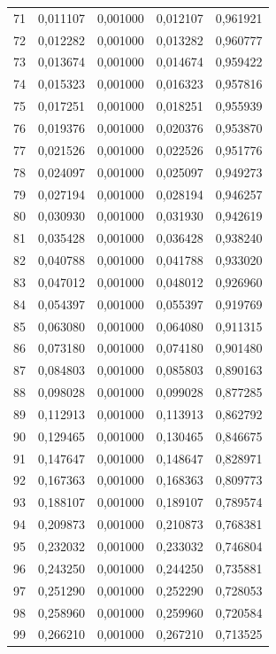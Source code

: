 \begin{small}
\begin{longtable}{rrrrr}
71 & 0,011107 & 0,001000 & 0,012107 & 0,961921 \\
72 & 0,012282 & 0,001000 & 0,013282 & 0,960777 \\
73 & 0,013674 & 0,001000 & 0,014674 & 0,959422 \\
74 & 0,015323 & 0,001000 & 0,016323 & 0,957816 \\
75 & 0,017251 & 0,001000 & 0,018251 & 0,955939 \\
76 & 0,019376 & 0,001000 & 0,020376 & 0,953870 \\
77 & 0,021526 & 0,001000 & 0,022526 & 0,951776 \\
78 & 0,024097 & 0,001000 & 0,025097 & 0,949273 \\
79 & 0,027194 & 0,001000 & 0,028194 & 0,946257 \\
80 & 0,030930 & 0,001000 & 0,031930 & 0,942619 \\
81 & 0,035428 & 0,001000 & 0,036428 & 0,938240 \\
82 & 0,040788 & 0,001000 & 0,041788 & 0,933020 \\
83 & 0,047012 & 0,001000 & 0,048012 & 0,926960 \\
84 & 0,054397 & 0,001000 & 0,055397 & 0,919769 \\
85 & 0,063080 & 0,001000 & 0,064080 & 0,911315 \\
86 & 0,073180 & 0,001000 & 0,074180 & 0,901480 \\
87 & 0,084803 & 0,001000 & 0,085803 & 0,890163 \\
88 & 0,098028 & 0,001000 & 0,099028 & 0,877285 \\
89 & 0,112913 & 0,001000 & 0,113913 & 0,862792 \\
90 & 0,129465 & 0,001000 & 0,130465 & 0,846675 \\
91 & 0,147647 & 0,001000 & 0,148647 & 0,828971 \\
92 & 0,167363 & 0,001000 & 0,168363 & 0,809773 \\
93 & 0,188107 & 0,001000 & 0,189107 & 0,789574 \\
94 & 0,209873 & 0,001000 & 0,210873 & 0,768381 \\
95 & 0,232032 & 0,001000 & 0,233032 & 0,746804 \\
96 & 0,243250 & 0,001000 & 0,244250 & 0,735881 \\
97 & 0,251290 & 0,001000 & 0,252290 & 0,728053 \\
98 & 0,258960 & 0,001000 & 0,259960 & 0,720584 \\
99 & 0,266210 & 0,001000 & 0,267210 & 0,713525 \\

\end{longtable}
\end{small}
